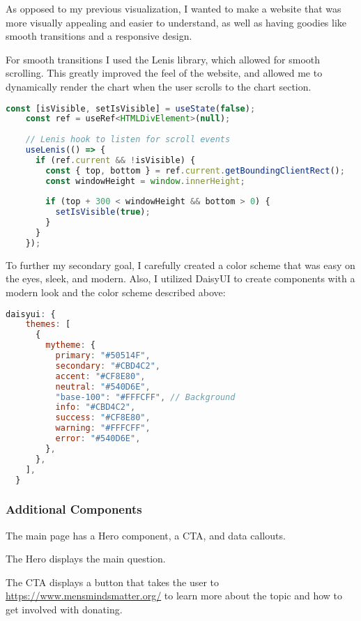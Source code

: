 \documentclass{article}
\begin{document}
As opposed to my previous visualization, I wanted to make a website that
was more visually appealing and easier to understand, as well as having 
goodies like smooth transitions and a responsive design.

For smooth transitions I used the Lenis library, which allowed for smooth 
scrolling. This greatly improved the feel of the website, and allowed me 
to dynamically render the chart when the user scrolls to the chart section.

\begin{lstlisting}[language=JavaScript]
const [isVisible, setIsVisible] = useState(false);
    const ref = useRef<HTMLDivElement>(null);
  
    // Lenis hook to listen for scroll events
    useLenis(() => {
      if (ref.current && !isVisible) {
        const { top, bottom } = ref.current.getBoundingClientRect();
        const windowHeight = window.innerHeight;
  
        if (top + 300 < windowHeight && bottom > 0) {
          setIsVisible(true);
        }
      }
    });
\end{lstlisting}

To further my secondary goal, I carefully created a color scheme that was
easy on the eyes, sleek, and modern. Also, I utilized DaisyUI to create 
components with a modern look and the color scheme described above:

\begin{lstlisting}[language=JavaScript]
  daisyui: {
    themes: [
      {
        mytheme: {
          primary: "#50514F",
          secondary: "#CBD4C2",
          accent: "#CF8E80",
          neutral: "#540D6E",
          "base-100": "#FFFCFF", // Background
          info: "#CBD4C2",
          success: "#CF8E80",
          warning: "#FFFCFF",
          error: "#540D6E",
        },
      },
    ],
  }
\end{lstlisting}

\subsubsection{Additional Components}
\label{subsubsec:Components}

The main page has a Hero component, a CTA, and data callouts.

The Hero displays the main question.

The CTA displays a button that takes the user to 
\url{https://www.mensmindsmatter.org/} to learn more about the topic
and how to get involved with donating.
\end{document}
